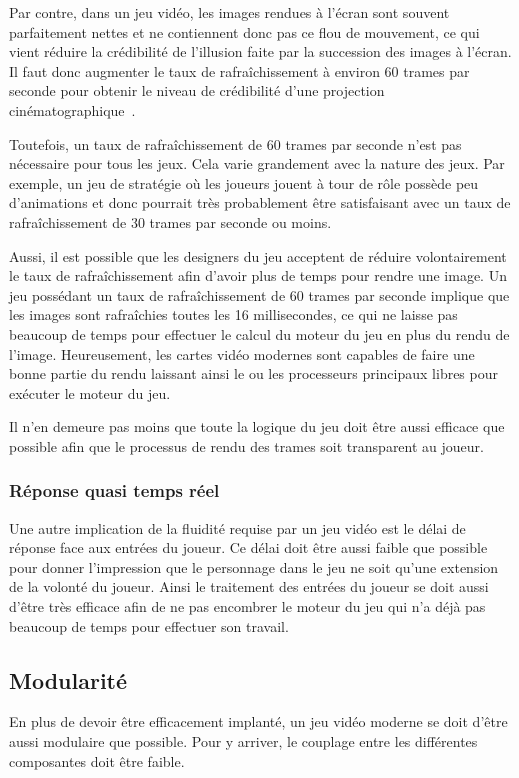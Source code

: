 \documentclass[12pt,twoside,letterpaper,francais]{book}
\begin{document}
Par contre, dans un jeu vidéo, les images rendues à l'écran sont
souvent parfaitement nettes et ne contiennent donc pas ce flou de
mouvement, ce qui vient réduire la crédibilité de l'illusion faite par
la succession des images à l'écran. Il faut donc augmenter le taux de
rafraîchissement à environ 60 trames par seconde pour obtenir le
niveau de crédibilité d'une projection
cinématographique~\cite{30vs60}.

Toutefois, un taux de rafraîchissement de 60 trames par seconde n'est
pas nécessaire pour tous les jeux. Cela varie grandement avec la
nature des jeux. Par exemple, un jeu de stratégie où les joueurs
jouent à tour de rôle possède peu d'animations et donc pourrait très
probablement être satisfaisant avec un taux de rafraîchissement de 30
trames par seconde ou moins.

Aussi, il est possible que les designers du jeu acceptent de réduire
volontairement le taux de rafraîchissement afin d'avoir plus de temps
pour rendre une image. Un jeu possédant un taux de rafraîchissement de
60 trames par seconde implique que les images sont rafraîchies toutes
les 16 millisecondes, ce qui ne laisse pas beaucoup de temps pour
effectuer le calcul du moteur du jeu en plus du rendu de
l'image. Heureusement, les cartes vidéo modernes sont capables de
faire une bonne partie du rendu laissant ainsi le ou les processeurs
principaux libres pour exécuter le moteur du jeu.

Il n'en demeure pas moins que toute la logique du jeu doit être aussi
efficace que possible afin que le processus de rendu des trames soit
transparent au joueur.

\FloatBarrier
\subsubsection{Réponse quasi temps réel}
Une autre implication de la fluidité requise par un jeu vidéo est le
délai de réponse face aux entrées du joueur. Ce délai doit être aussi
faible que possible pour donner l'impression que le personnage dans le
jeu ne soit qu'une extension de la volonté du joueur. Ainsi le
traitement des entrées du joueur se doit aussi d'être très efficace
afin de ne pas encombrer le moteur du jeu qui n'a déjà pas beaucoup de
temps pour effectuer son travail.

\FloatBarrier
\subsection{Modularité}
En plus de devoir être efficacement implanté, un jeu vidéo moderne se
doit d'être aussi modulaire que possible. Pour y arriver, le couplage
entre les différentes composantes doit être faible.
\end{document}
